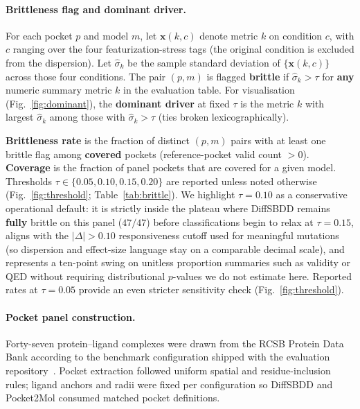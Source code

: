 \documentclass[11pt]{article}
\begin{document}
\paragraph{Brittleness flag and dominant driver.}

For each pocket $p$ and model $m$, let $\mathbf{x}(k,c)$ denote metric $k$ on condition $c$, with $c$ ranging over the four featurization-stress tags (the original condition is excluded from the dispersion). Let $\hat{\sigma}_k$ be the sample standard deviation of $\{\mathbf{x}(k,c)\}$ across those four conditions. The pair $(p,m)$ is flagged \textbf{brittle} if $\hat{\sigma}_k > \tau$ for \textbf{any} numeric summary metric $k$ in the evaluation table.
For visualisation (Fig.~\ref{fig:dominant}), the \textbf{dominant driver} at fixed $\tau$ is the metric $k$ with largest $\hat{\sigma}_k$ among those with $\hat{\sigma}_k > \tau$ (ties broken lexicographically).

\textbf{Brittleness rate} is the fraction of distinct $(p,m)$ pairs with at least one brittle flag among \textbf{covered} pockets (reference-pocket valid count $> 0$). \textbf{Coverage} is the fraction of panel pockets that are covered for a given model. Thresholds $\tau \in \{0.05, 0.10, 0.15, 0.20\}$ are reported unless noted otherwise (Fig.~\ref{fig:threshold}; Table~\ref{tab:brittle}). We highlight $\tau = 0.10$ as a conservative operational default: it is strictly inside the plateau where DiffSBDD remains \textbf{fully} brittle on this panel ($47/47$) before classifications begin to relax at $\tau = 0.15$, aligns with the $|\Delta| > 0.10$ responsiveness cutoff used for meaningful mutations (so dispersion and effect-size language stay on a comparable decimal scale), and represents a ten-point swing on unitless proportion summaries such as validity or QED without requiring distributional $p$-values we do not estimate here. Reported rates at $\tau = 0.05$ provide an even stricter sensitivity check (Fig.~\ref{fig:threshold}).

\paragraph{Pocket panel construction.}
Forty-seven protein--ligand complexes were drawn from the RCSB Protein Data Bank according to the benchmark configuration shipped with the evaluation repository~\cite{berman2000pdb}. Pocket extraction followed uniform spatial and residue-inclusion rules; ligand anchors and radii were fixed per configuration so DiffSBDD and Pocket2Mol consumed matched pocket definitions.
\end{document}
